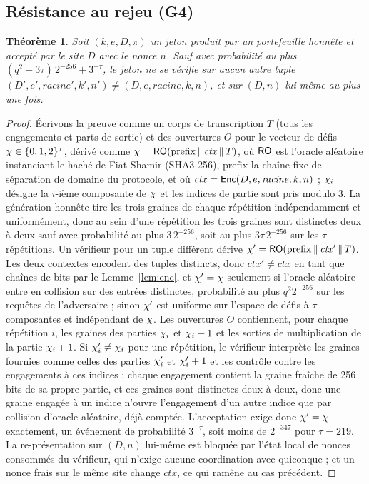 \documentclass[11pt]{article}
\newtheorem{theorem}{Th\'eor\`eme}
\theoremstyle{definition}
\begin{document}
\subsection{Résistance au rejeu (G4)}

\begin{theorem}
\label{thm:replay}
Soit $(k, e, D, \pi)$ un jeton produit par un portefeuille honnête et accepté par le site
$D$ avec le nonce $n$. Sauf avec probabilité au plus $(q^2 + 3\tau)\,2^{-256} +
3^{-\tau}$, le jeton ne se vérifie sur aucun autre tuple $(D', e', \mathit{racine}', k',
n') \ne (D, e, \mathit{racine}, k, n)$, et sur $(D, n)$ lui-même au plus une fois.
\end{theorem}

\begin{proof}
Écrivons la preuve comme un corps de transcription $T$ (tous les engagements et parts de
sortie) et des ouvertures $O$ pour le vecteur de défis $\chi \in \{0,1,2\}^\tau$, dérivé
comme $\chi = \mathsf{RO}(\mathrm{prefix} \,\|\, \mathit{ctx} \,\|\, T)$, où $\mathsf{RO}$ est l'oracle
aléatoire instanciant le haché de Fiat-Shamir (SHA3-256), $\mathrm{prefix}$ la chaîne fixe
de séparation de domaine du protocole, et où $\mathit{ctx} = \mathsf{Enc}(D, e, \mathit{racine}, k, n)$ ; $\chi_i$ désigne la $i$-ième composante de $\chi$ et les indices de
partie sont pris modulo 3. La génération honnête tire les trois graines de chaque
répétition indépendamment et uniformément, donc au sein d'une répétition les trois graines
sont distinctes deux à deux sauf avec probabilité au plus $3\,2^{-256}$, soit au plus
$3\tau\,2^{-256}$ sur les $\tau$ répétitions. Un
vérifieur pour un tuple différent dérive $\chi' = \mathsf{RO}(\mathrm{prefix} \,\|\, \mathit{ctx}'
\,\|\, T)$. Les deux contextes encodent des tuples distincts, donc $\mathit{ctx}' \ne \mathit{ctx}$
en tant que chaînes de bits par le Lemme~\ref{lem:enc}, et $\chi' = \chi$
seulement si l'oracle aléatoire entre en collision sur des entrées distinctes, probabilité
au plus $q^2 2^{-256}$ sur les requêtes de l'adversaire ; sinon $\chi'$ est uniforme sur
l'espace de défis à $\tau$ composantes et indépendant de $\chi$. Les ouvertures $O$
contiennent, pour chaque répétition $i$, les graines des parties $\chi_i$ et $\chi_i + 1$ et les
sorties de multiplication de la partie $\chi_i + 1$. Si $\chi'_i \ne \chi_i$ pour une répétition,
le vérifieur interprète les graines fournies comme celles des parties $\chi'_i$ et $\chi'_i + 1$
et les contrôle contre les engagements à ces indices ; chaque engagement contient la
graine fraîche de 256 bits de sa propre partie, et ces graines sont distinctes deux à
deux, donc une graine engagée à un indice
n'ouvre l'engagement d'un autre indice que par collision d'oracle aléatoire, déjà comptée.
L'acceptation exige donc $\chi' = \chi$ exactement, un événement de probabilité $3^{-\tau}$,
soit moins de $2^{-347}$ pour $\tau = 219$. La re-présentation sur $(D, n)$ lui-même est
bloquée par l'état local de nonces consommés du vérifieur, qui n'exige aucune coordination
avec quiconque ; et un nonce frais sur le même site change $\mathit{ctx}$, ce qui ramène
au cas précédent.
\end{proof}
\end{document}
